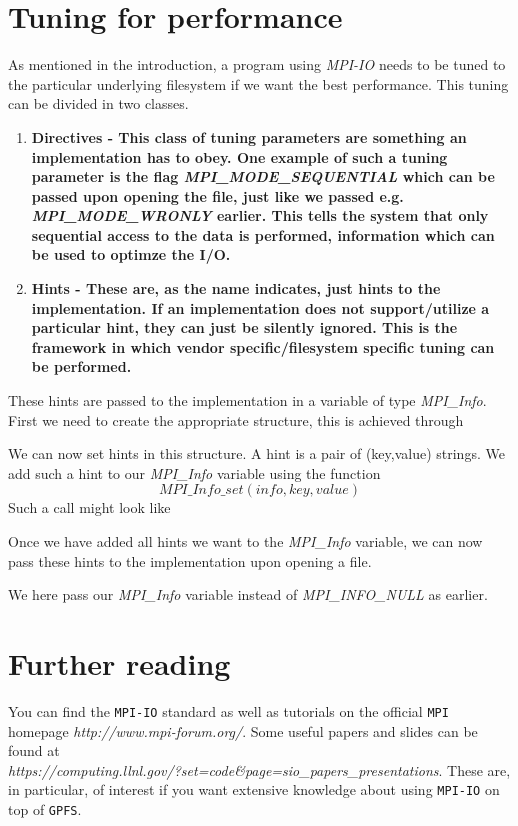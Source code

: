 \documentclass[twoside, 11pt, a4paper]{article}
\begin{document}
\section{Tuning for performance}
As mentioned in the introduction, a program using \emph{MPI-IO} needs to be tuned
to the particular underlying filesystem if we want the best performance.
This tuning can be divided in two classes.
\noindent
\begin{enumerate}
	\renewcommand{\theenumi}{$\bullet$}
	\renewcommand{\labelenumi}{\theenumi}
	\item \bf Directives \rm - This class of tuning parameters are something an
			  implementation has to obey. One example of such a tuning parameter is
			  the flag \emph{MPI\_MODE\_SEQUENTIAL} which can be passed upon
			  opening the file, just like we passed e.g. \\
			  \emph{MPI\_MODE\_WRONLY} earlier. This tells the system
			  that only sequential access to the data is performed, information
			  which can be used to optimze the I/O.
	\item \bf Hints \rm - These are, as the name indicates, just hints to the
			  implementation. If an implementation does not support/utilize
			  a particular hint, they can just be silently ignored. This
			  is the framework in which vendor specific/filesystem specific tuning
			  can be performed.
\end{enumerate}

These hints are passed to the implementation in a variable of type \emph{MPI\_Info}.
First we need to create the appropriate structure, this is achieved through

We can now set hints in this structure. A hint is a pair of (key,value) strings.
We add such a hint to our \emph{MPI\_Info} variable using the function
\[
	MPI\_Info\_set(info,key,value)
\]
Such a call might look like


Once we have added all hints we want to the \emph{MPI\_Info} variable, we can now
pass these hints to the implementation upon opening a file.

We here pass our \emph{MPI\_Info} variable instead of \emph{MPI\_INFO\_NULL} as earlier.

\section{Further reading}
You can find the \texttt{MPI-IO} standard as well as tutorials on the official
\texttt{MPI} homepage \emph{http://www.mpi-forum.org/}. Some useful papers and slides
can be found at \\
\emph{https://computing.llnl.gov/?set=code\&page=sio\_papers\_presentations}.
These are, in particular, of interest if you want extensive knowledge about using
\texttt{MPI-IO} on top of \texttt{GPFS}.
\end{document}
